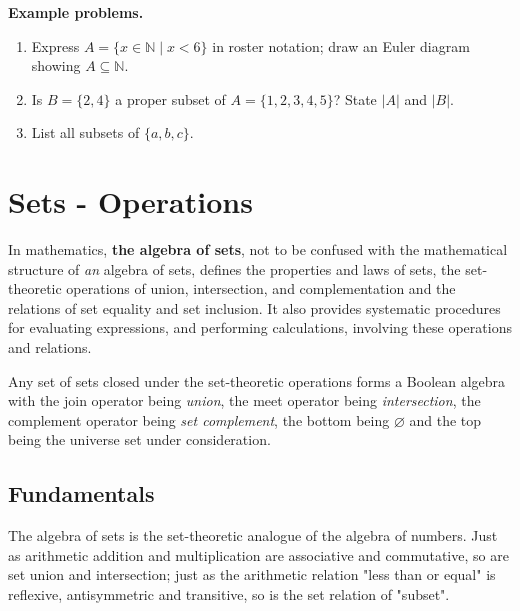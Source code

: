 \textbf{Example problems.}
\begin{enumerate}
    \item Express $A=\{x\in\mathbb{N}\mid x<6\}$ in roster notation;
          draw an Euler diagram showing $A\subseteq\mathbb{N}$.
    \item Is $B=\{2,4\}$ a proper subset of $A=\{1,2,3,4,5\}$? State
          $|A|$ and $|B|$.
    \item List all subsets of $\{a,b,c\}$.
\end{enumerate}



\section{Sets - Operations}
\label{sec:sets-9784}


In mathematics, \textbf{the algebra of sets}, not to be confused with the mathematical
structure of \textit{an} algebra of sets, defines the properties and laws of sets, the
set-theoretic operations of union, intersection, and complementation and the relations of
set equality and set inclusion. It also provides systematic procedures for evaluating
expressions, and performing calculations, involving these operations and relations.



Any set of sets closed under the set-theoretic operations forms a Boolean algebra with the
join operator being \textit{union}, the meet operator being \textit{intersection}, the
complement operator being \textit{set complement}, the bottom being $\varnothing$ and the
top being the universe set under consideration.




\subsection{Fundamentals}
\label{sss:fund-67af}




The algebra of sets is the set-theoretic analogue of the algebra of numbers. Just as
arithmetic addition and multiplication are associative and commutative, so are set union
and intersection; just as the arithmetic relation "less than or equal" is reflexive,
antisymmetric and transitive, so is the set relation of "subset".



